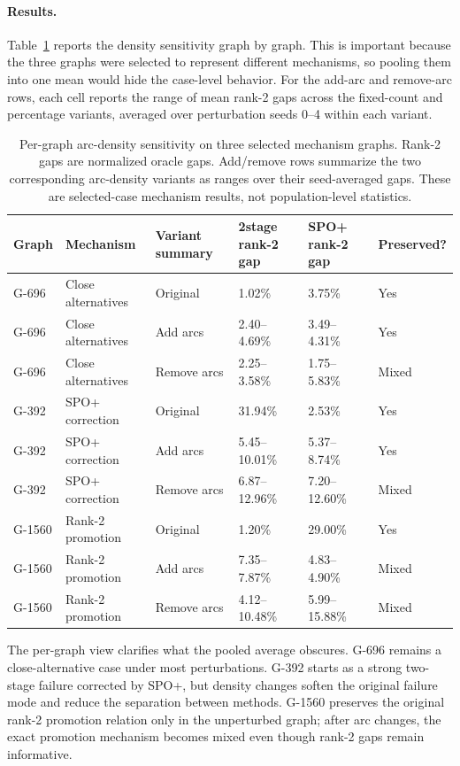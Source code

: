 \paragraph{Results.}
Table~\ref{tab:density-summary} reports the density sensitivity graph by graph.
This is important because the three graphs were selected to represent different
mechanisms, so pooling them into one mean would hide the case-level behavior. For
the add-arc and remove-arc rows, each cell reports the range of mean rank-2 gaps
across the fixed-count and percentage variants, averaged over perturbation seeds
0--4 within each variant.

\begin{table}[t]
\centering
\small
\setlength{\tabcolsep}{3pt}
\begin{tabular}{@{}llllll@{}}
\toprule
Graph & Mechanism & Variant summary & 2stage rank-2 gap & SPO+ rank-2 gap & Preserved? \\
\midrule
G-696 & Close alternatives & Original & 1.02\% & 3.75\% & Yes \\
G-696 & Close alternatives & Add arcs & 2.40--4.69\% & 3.49--4.31\% & Yes \\
G-696 & Close alternatives & Remove arcs & 2.25--3.58\% & 1.75--5.83\% & Mixed \\
\midrule
G-392 & SPO+ correction & Original & 31.94\% & 2.53\% & Yes \\
G-392 & SPO+ correction & Add arcs & 5.45--10.01\% & 5.37--8.74\% & Yes \\
G-392 & SPO+ correction & Remove arcs & 6.87--12.96\% & 7.20--12.60\% & Mixed \\
\midrule
G-1560 & Rank-2 promotion & Original & 1.20\% & 29.00\% & Yes \\
G-1560 & Rank-2 promotion & Add arcs & 7.35--7.87\% & 4.83--4.90\% & Mixed \\
G-1560 & Rank-2 promotion & Remove arcs & 4.12--10.48\% & 5.99--15.88\% & Mixed \\
\bottomrule
\end{tabular}
\caption{Per-graph arc-density sensitivity on three selected mechanism graphs.
Rank-2 gaps are normalized oracle gaps. Add/remove rows summarize the two
corresponding arc-density variants as ranges over their seed-averaged gaps. These
are selected-case mechanism results, not population-level statistics.}
\label{tab:density-summary}
\end{table}

The per-graph view clarifies what the pooled average obscures. G-696 remains a
close-alternative case under most perturbations. G-392 starts as a strong
two-stage failure corrected by SPO+, but density changes soften the original
failure mode and reduce the separation between methods. G-1560 preserves the
original rank-2 promotion relation only in the unperturbed graph; after arc
changes, the exact promotion mechanism becomes mixed even though rank-2 gaps
remain informative.

